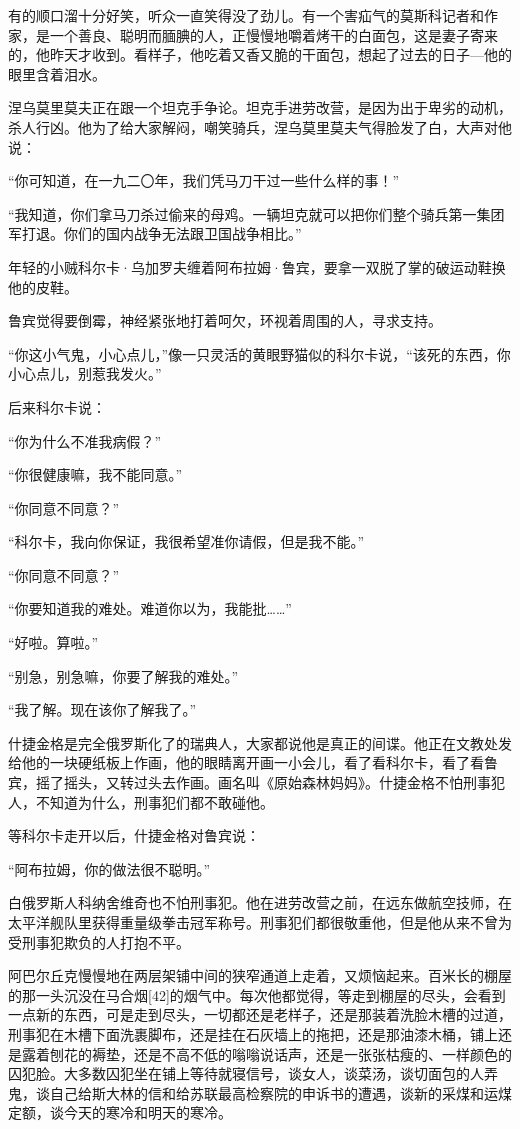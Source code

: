 有的顺口溜十分好笑，听众一直笑得没了劲儿。有一个害疝气的莫斯科记者和作家，是一个善良、聪明而腼腆的人，正慢慢地嚼着烤干的白面包，这是妻子寄来的，他昨天才收到。看样子，他吃着又香又脆的干面包，想起了过去的日子—他的眼里含着泪水。

涅乌莫里莫夫正在跟一个坦克手争论。坦克手进劳改营，是因为出于卑劣的动机，杀人行凶。他为了给大家解闷，嘲笑骑兵，涅乌莫里莫夫气得脸发了白，大声对他说：

“你可知道，在一九二〇年，我们凭马刀干过一些什么样的事！”

“我知道，你们拿马刀杀过偷来的母鸡。一辆坦克就可以把你们整个骑兵第一集团军打退。你们的国内战争无法跟卫国战争相比。”

年轻的小贼科尔卡·乌加罗夫缠着阿布拉姆·鲁宾，要拿一双脱了掌的破运动鞋换他的皮鞋。

鲁宾觉得要倒霉，神经紧张地打着呵欠，环视着周围的人，寻求支持。

“你这小气鬼，小心点儿，”像一只灵活的黄眼野猫似的科尔卡说，“该死的东西，你小心点儿，别惹我发火。”

后来科尔卡说：

“你为什么不准我病假？”

“你很健康嘛，我不能同意。”

“你同意不同意？”

“科尔卡，我向你保证，我很希望准你请假，但是我不能。”

“你同意不同意？”

“你要知道我的难处。难道你以为，我能批……”

“好啦。算啦。”

“别急，别急嘛，你要了解我的难处。”

“我了解。现在该你了解我了。”

什捷金格是完全俄罗斯化了的瑞典人，大家都说他是真正的间谍。他正在文教处发给他的一块硬纸板上作画，他的眼睛离开画一小会儿，看了看科尔卡，看了看鲁宾，摇了摇头，又转过头去作画。画名叫《原始森林妈妈》。什捷金格不怕刑事犯人，不知道为什么，刑事犯们都不敢碰他。

等科尔卡走开以后，什捷金格对鲁宾说：

“阿布拉姆，你的做法很不聪明。”

白俄罗斯人科纳舍维奇也不怕刑事犯。他在进劳改营之前，在远东做航空技师，在太平洋舰队里获得重量级拳击冠军称号。刑事犯们都很敬重他，但是他从来不曾为受刑事犯欺负的人打抱不平。

阿巴尔丘克慢慢地在两层架铺中间的狭窄通道上走着，又烦恼起来。百米长的棚屋的那一头沉没在马合烟[42]的烟气中。每次他都觉得，等走到棚屋的尽头，会看到一点新的东西，可是走到尽头，一切都还是老样子，还是那装着洗脸木槽的过道，刑事犯在木槽下面洗裹脚布，还是挂在石灰墙上的拖把，还是那油漆木桶，铺上还是露着刨花的褥垫，还是不高不低的嗡嗡说话声，还是一张张枯瘦的、一样颜色的囚犯脸。大多数囚犯坐在铺上等待就寝信号，谈女人，谈菜汤，谈切面包的人弄鬼，谈自己给斯大林的信和给苏联最高检察院的申诉书的遭遇，谈新的采煤和运煤定额，谈今天的寒冷和明天的寒冷。

